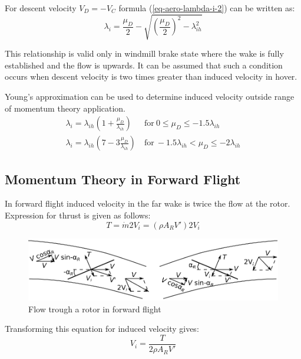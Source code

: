 For descent velocity $V_D = - V_C$ formula (\ref{eq-aero-lambda-i-2}) can be written as:
\begin{equation}
  \lambda_i
  =
  \frac{\mu_D}{2}
  -
  \sqrt{ \left( \frac{\mu_D}{2} \right)^2 - \lambda_{ih}^2 }
\end{equation}

This relationship is valid only in windmill brake state where the wake is fully established and the flow is upwards. \cite{Padfield2007} It can be assumed that such a condition occurs when descent velocity is two times greater than induced velocity in hover. \cite{Stepniewski1984}

Young’s approximation can be used to determine induced velocity outside range of momentum theory application. \cite{Padfield2007}
\begin{align}
  \lambda_i
  =
  \lambda_{ih} \left( 1 + \frac{\mu_D}{\lambda_{ih}} \right)
  &\mathrm{~for~} 0 \leq \mu_D \leq -1.5 \lambda_{ih} \\
  \lambda_i
  =
  \lambda_{ih} \left( 7 - 3 \frac{\mu_D}{\lambda_{ih}} \right)
  &\mathrm{~for~} -1.5 \lambda_{ih} < \mu_D \leq -2 \lambda_{ih}
\end{align}

\subsection{Momentum Theory in Forward Flight}

In forward flight induced velocity in the far wake is twice the flow at the rotor. \cite{Padfield2007} Expression for thrust is given as follows:
\begin{equation}
  T = \dot m 2 V_i = \left( \rho A_R V' \right) 2 V_i
\end{equation}

\begin{figure}
  \centering
  \includegraphics[width=120mm]{eps/momentum_theory_forward.eps}
  \caption{Flow trough a rotor in forward flight}
\end{figure}

Transforming this equation for induced velocity gives:
\begin{equation}
  \label{eq-aero-lambda-i-3}
  V_i = \frac{T}{ 2 \rho A_R V' }
\end{equation}


